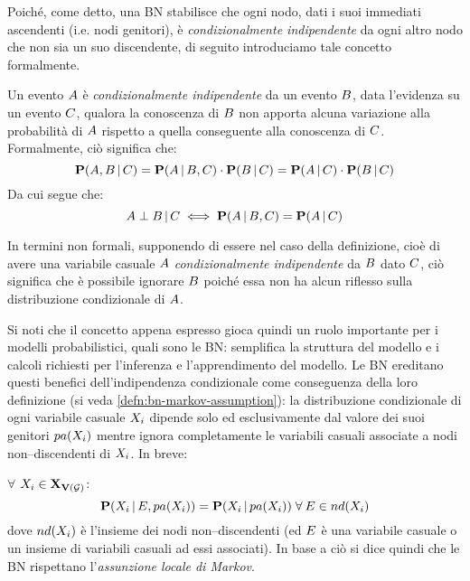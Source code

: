 Poiché, come detto, una \acl{BN} stabilisce che ogni nodo, dati i suoi immediati ascendenti (i.e. nodi genitori), è \emph{condizionalmente indipendente} da ogni altro nodo che non sia un suo discendente, di seguito introduciamo tale concetto formalmente.
\begin{definizione}\label{defn:ic}
Un evento $\mathnormal{A}$ è \emph{condizionalmente indipendente} da un evento $\mathnormal{B}$, data l'evidenza su un evento $\mathnormal{C}$, qualora la conoscenza di $\mathnormal{B}$ non apporta alcuna variazione alla probabilità di $\mathnormal{A}$ rispetto a quella conseguente alla conoscenza di $\mathnormal{C}$.
Formalmente, ciò significa che:
\[
\mathbf{P}(\mathnormal{A},\mathnormal{B}\,|\,\mathnormal{C})=\mathbf{P}(\mathnormal{A}\,|\,\mathnormal{B},\mathnormal{C})\cdot\mathbf{P}(\mathnormal{B}\,|\,\mathnormal{C})=\mathbf{P}(\mathnormal{A}\,|\,\mathnormal{C})\cdot\mathbf{P}(\mathnormal{B}\,|\,\mathnormal{C})
\]
Da cui segue che:
\[
\mathnormal{A}\perp\mathnormal{B}\,|\,\mathnormal{C}\iff\mathbf{P}(\mathnormal{A}\,|\,\mathnormal{B},\mathnormal{C})=\mathbf{P}(\mathnormal{A}\,|\,\mathnormal{C})
\]
\end{definizione}
In termini non formali, supponendo di essere nel caso della definizione, cioè di avere una variabile casuale $\mathnormal{A}$ \emph{condizionalmente indipendente} da $\mathnormal{B}$ dato $\mathnormal{C}$, ciò significa che è possibile ignorare $\mathnormal{B}$ poiché essa non ha alcun riflesso sulla distribuzione condizionale di $\mathnormal{A}$.

Si noti che il concetto appena espresso gioca quindi un ruolo importante per i modelli probabilistici, quali sono le \acl{BN}: semplifica la struttura del modello e i calcoli richiesti per l'inferenza e l'apprendimento del modello. Le \acl{BN} ereditano questi benefici dell'indipendenza condizionale come conseguenza della loro definizione (si veda \ref{defn:bn-markov-assumption}): la distribuzione condizionale di ogni variabile casuale $\mathnormal{X_i}$ dipende solo ed esclusivamente dal valore dei suoi genitori $pa(\mathnormal{X_i})$ mentre ignora completamente le variabili casuali associate a nodi non--discendenti di $\mathnormal{X_i}$. In breve:

$\forall$ $\mathnormal{X_i}\in\mathbf{X}_{\mathbf{V}(\mathcal{G})}$:
\[
\mathbf{P}(\mathnormal{X_i}\,|\,\mathnormal{E},pa(\mathnormal{X_i}))=\mathbf{P}(\mathnormal{X_i}\,|\,pa(\mathnormal{X_i}))\;\forall\:\mathnormal{E}\in nd(\mathnormal{X_i})
\]
dove $nd(\mathnormal{X_i})$ è l'insieme dei nodi non--discendenti (ed $\mathnormal{E}$ è una variabile casuale o un insieme di variabili casuali ad essi associati).
In base a ciò si dice quindi che le \acl{BN} rispettano l'\emph{assunzione locale di Markov}.


